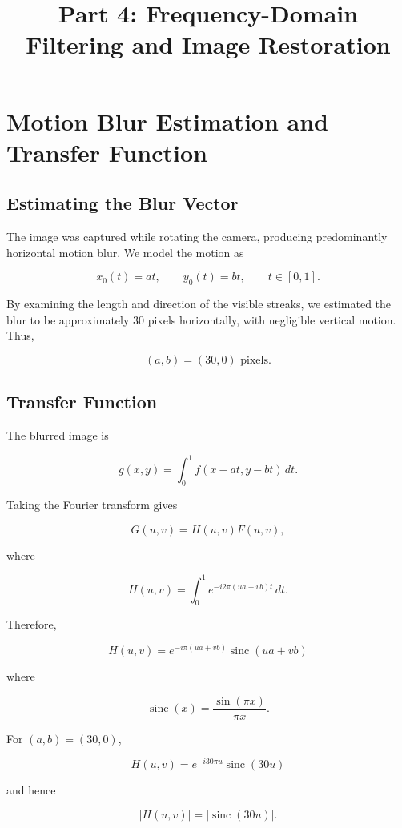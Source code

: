 \documentclass[11pt,a4paper]{article}
\title{\textbf{\Large Part 4: Frequency-Domain Filtering and Image Restoration}}
\author{}
\date{}
\begin{document}
\maketitle

\section{Motion Blur Estimation and Transfer Function}

\subsection{Estimating the Blur Vector}

The image was captured while rotating the camera, producing predominantly horizontal motion blur. We model the motion as

\[
x_0(t)=at,\qquad y_0(t)=bt,\qquad t\in[0,1].
\]

By examining the length and direction of the visible streaks, we estimated the blur to be approximately 30 pixels horizontally, with negligible vertical motion. Thus,

\[
\boxed{(a,b)=(30,0)\text{ pixels}.}
\]

\subsection{Transfer Function}

The blurred image is

\[
g(x,y)=\int_0^1 f(x-at,y-bt)\,dt.
\]

Taking the Fourier transform gives

\[
G(u,v)=H(u,v)F(u,v),
\]

where

\[
H(u,v)
=
\int_0^1 e^{-i2\pi(ua+vb)t}\,dt.
\]

Therefore,

\[
\boxed{
H(u,v)
=
e^{-i\pi(ua+vb)}
\operatorname{sinc}(ua+vb)
}
\]

where

\[
\operatorname{sinc}(x)=\frac{\sin(\pi x)}{\pi x}.
\]

For $(a,b)=(30,0)$,

\[
\boxed{
H(u,v)=e^{-i30\pi u}\operatorname{sinc}(30u)
}
\]

and hence

\[
\boxed{|H(u,v)|=|\operatorname{sinc}(30u)|.}
\]
\end{document}
